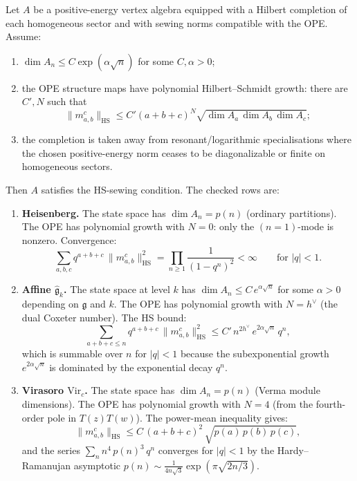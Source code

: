 \begin{theorem}
Let $A$ be a positive-energy vertex algebra equipped with a Hilbert
completion of each homogeneous sector and with sewing norms compatible
with the OPE.  Assume:
\begin{enumerate}[label=\textup{(\alph*)}, leftmargin=2.4em]
\item $\dim A_n \le C\exp(\alpha\sqrt n)$ for some $C,\alpha>0$;
\item the OPE structure maps have polynomial Hilbert--Schmidt growth:
there are $C',N$ such that
\[
\|m_{a,b}^c\|_{\mathrm{HS}}
\le
C'(a+b+c)^N
\sqrt{\dim A_a\,\dim A_b\,\dim A_c};
\]
\item the completion is taken away from resonant/logarithmic
specialisations where the chosen positive-energy norm ceases to be
diagonalizable or finite on homogeneous sectors.
\end{enumerate}
Then $A$ satisfies the HS-sewing condition.  The checked rows are:

\begin{enumerate}[leftmargin=2.4em]
\item \textbf{Heisenberg.}
The state space has $\dim A_n = p(n)$ (ordinary partitions).
The OPE has polynomial growth with $N = 0$: only the
$(n=1)$-mode is nonzero. Convergence:
\[
\sum_{a,b,c} q^{a+b+c}\,\|m_{a,b}^c\|_{\mathrm{HS}}^2
=
\prod_{n \ge 1} \frac{1}{(1-q^n)^2}
< \infty
\qquad\text{for }|q| < 1.
\]

\item \textbf{Affine $\widehat{\mathfrak{g}}_k$.}
The state space at level $k$ has
$\dim A_n \le C\, e^{\alpha\sqrt{n}}$ for some $\alpha > 0$
depending on $\mathfrak{g}$ and $k$. The OPE has polynomial growth
with $N = h^\vee$ (the dual Coxeter number).
The HS bound:
\[
\sum_{a+b+c \le n} q^{a+b+c}\,\|m_{a,b}^c\|_{\mathrm{HS}}^2
\le
C'\,n^{2h^\vee}\,e^{2\alpha\sqrt{n}}\, q^n,
\]
which is summable over $n$ for $|q| < 1$ because the subexponential
growth $e^{2\alpha\sqrt{n}}$ is dominated by the exponential decay $q^n$.

\item \textbf{Virasoro $\mathrm{Vir}_c$.}
The state space has $\dim A_n = p(n)$ (Verma module dimensions).
The OPE has polynomial growth with $N = 4$ (from the fourth-order
pole in $T(z)T(w)$). The power-mean inequality gives:
\[
\|m_{a,b}^c\|_{\mathrm{HS}}
\le
C\,(a+b+c)^2\,\sqrt{p(a)\,p(b)\,p(c)},
\]
and the series $\sum_{n} n^4\,p(n)^3\,q^n$ converges for $|q|<1$
by the Hardy--Ramanujan asymptotic $p(n) \sim
\frac{1}{4n\sqrt{3}}\exp(\pi\sqrt{2n/3})$.


\end{enumerate}
\end{theorem}
